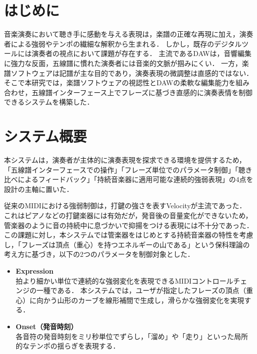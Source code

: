 

\section{はじめに}
音楽演奏において聴き手に感動を与える表現は，楽譜の正確な再現に加え，演奏者による強弱やテンポの繊細な解釈から生まれる．
しかし，既存のデジタルツールには演奏者の視点において課題が存在する．
主流であるDAW\cite{DAW}は，音響編集に強力な反面，五線譜に慣れた演奏者には音楽的文脈が掴みにくい．
一方，楽譜ソフトウェアは記譜が主な目的であり，演奏表現の微調整は直感的ではない．
そこで本研究では，楽譜ソフトウェアの視認性とDAWの柔軟な編集能力を組み合わせ，五線譜インターフェース上でフレーズに基づき直感的に演奏表情を制御できるシステムを構築した．

\section{システム概要}
本システムは，演奏者が主体的に演奏表現を探求できる環境を提供するため，「五線譜インターフェースでの操作」「フレーズ単位でのパラメータ制御」「聴き比べによるフィードバック」「持続音楽器に適用可能な連続的強弱表現」の4点を設計の主軸に置いた．

従来のMIDIにおける強弱制御は，打鍵の強さを表すVelocityが主流であった．
これはピアノなどの打鍵楽器には有効だが，発音後の音量変化ができないため，管楽器のように音の持続中に息づかいで抑揚をつける表現には不十分であった．
この課題に対し，本システムでは管楽器をはじめとする持続音楽器の特性を考慮し，「フレーズは頂点（重心）を持つエネルギーの山である」という保科理論\cite{Hoshina}の考え方に基づき，以下の2つのパラメータを制御対象とした．

\begin{itemize}
    \item \textbf{Expression}\\
        拍より細かい単位で連続的な強弱変化を表現できるMIDIコントロールチェンジの一種である．
        本システムでは，ユーザが指定したフレーズの頂点（重心）に向かう山形のカーブを線形補間で生成し，滑らかな強弱変化を実現する．
    \item \textbf{Onset（発音時刻）}\\
        各音符の発音時刻をミリ秒単位でずらし，「溜め」や「走り」といった局所的なテンポの揺らぎを表現する．
\end{itemize}

